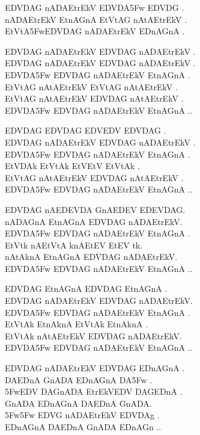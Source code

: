 \documentclass{tufte-book}
\def\samaindent{\parindent=0.5in}
\def\dnitem#1{\noindent\llap{#1\space}\leftskip\parindent}
\begin{document}
{\dn \dnnum
{\dnsamaveda \samaindent
\dnitem{kAydA}

EDVDAG\? nADAEtrEkV EDVDA\35Fw EDVDG\? .\\
nADAEtrEkV EtnAG\?nA EtVtAG\? nAtAEtrEkV .\\
EtVtA\35FwEDVDAG\? nADAEtrEkV EDnAG\?nA .

\dnitem{plVA \rn{1}}

EDVDAG\? nADAEtrEkV EDVDAG\? nADAEtrEkV .\\
EDVDAG\? nADAEtrEkV EDVDAG\? nADAEtrEkV .\\
EDVDA\35Fw EDVDAG\? nADAEtrEkV EtnAG\?nA .\\
EtVtAG\? nAtAEtrEkV EtVtAG\? nAtAEtrEkV .\\
EtVtAG\? nAtAEtrEkV EDVDAG\? nAtAEtrEkV .\\
EDVDA\35Fw EDVDAG\? nADAEtrEkV EtnAG\?nA ..

\dnitem{\rn{1}{\rs -\re}\rn{2}}

EDVDAG\?  EDVDAG\? EDVEDV EDVDAG\? .\\
EDVDAG\? nADAEtrEkV EDVDAG\? nADAEtrEkV .\\
EDVDA\35Fw EDVDAG\? nADAEtrEkV EtnAG\?nA .\\
EtVDAk\?  EtVtAk\? EtVEtV EtVtAk\? .\\
EtVtAG\? nAtAEtrEkV EDVDAG\? nAtAEtrEkV .\\
EDVDA\35Fw EDVDAG\? nADAEtrEkV EtnAG\?nA ..

\dnitem{\rn{1}{\rs -\re}\rn{3}}

EDVDAG\?  nAEDEVDA G\?nAEDEV EDEVDAG\?.\\
nADAG\?nA  EtnAG\?nA EDVDAG\? nADAEtrEkV.\\
EDVDA\35Fw EDVDAG\? nADAEtrEkV EtnAG\?nA .\\
EtVtk\?  nAEtVtA k\?nAEtEV EtEV tk\?.\\
nAtAk\?nA  EtnAG\?nA EDVDAG\? nADAEtrEkV.\\
EDVDA\35Fw EDVDAG\? nADAEtrEkV EtnAG\?nA ..

\dnitem{\rn{1}{\rs -\re}\rn{4}}

EDVDAG\?  EtnAG\?nA EDVDAG\? EtnAG\?nA .\\
EDVDAG\? nADAEtrEkV  EDVDAG\? nADAEtrEkV.\\
EDVDA\35Fw EDVDAG\? nADAEtrEkV EtnAG\?nA .\\
EtVtAk\?  EtnAk\?nA EtVtAk\? EtnAk\?nA .\\
EtVtAk\? nAtAEtrEkV  EDVDAG\? nADAEtrEkV.\\
EDVDA\35Fw EDVDAG\? nADAEtrEkV EtnAG\?nA ..

\dnitem{EthA{}I}

EDVDAG\? nADAEtrEkV EDVDAG\? EDnAG\?nA .\\
DAEDnA G\?nADA EDnAG\?nA DA\35Fw .\\
\35FwEDV DAG\?nADA EtrEkVEDV DAG\?EDnA .\\
G\?nADA EDnAG\?nA DAEDnA G\?nADA.\\
\35Fw\35Fw EDVG\? nADAEtrEkV EDVDAg\4 .\\
EDnAG\?nA DAEDnA G\?nADA EDnAG\?n ..

}}
\end{document}
